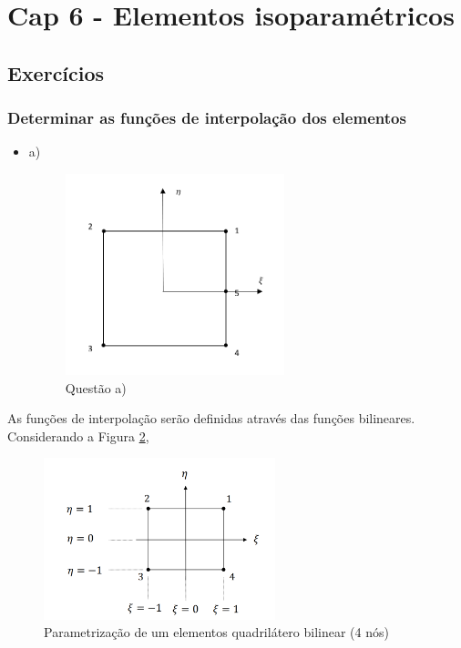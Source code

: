 \section{Cap 6 - Elementos isoparamétricos}

\subsection{Exercícios}

\subsubsection{Determinar as funções de interpolação dos elementos}
%
\begin{itemize}
	\item a)
	\begin{figure}[H]
	\includegraphics[width=0.6\textwidth,center]{fig/cap6_1_a.PNG}
	\caption{Questão a)} 
	\label{cap6:cap6_1_a}
\end{figure}
\end{itemize}
%
As funções de interpolação serão definidas através das funções bilineares. Considerando a Figura \ref{cap6:quad_bilinear_0}, 
%
\begin{figure}[H]
	\includegraphics[width=0.6\textwidth,center]{fig/quadrilatero_4_livro.PNG}
	\caption{Parametrização de um elementos quadrilátero bilinear (4 nós)} 
	\label{cap6:quad_bilinear_0}
\end{figure}
